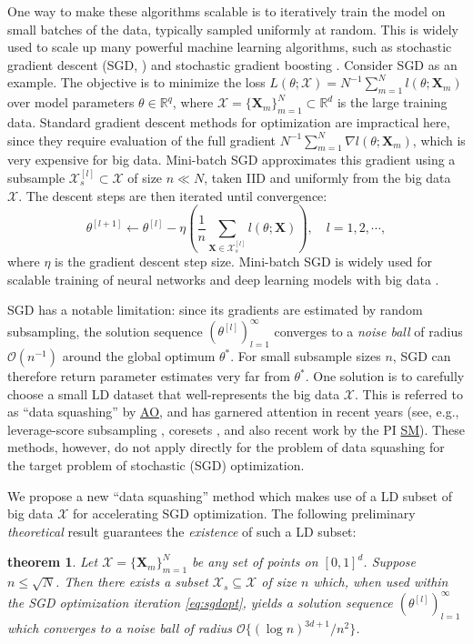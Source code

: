 \documentclass[11pt]{NSFamsart}
\newcommand{\SM}{\hyperlink{SMlink}{SM}\xspace}
\newcommand{\AO}{\hyperlink{AOlink}{AO}\xspace}
\newtheorem{theorem}{theorem}
\newcommand{\bX}{{\boldsymbol{X}}}
\begin{document}
One way to make these algorithms scalable is to iteratively train the model on small batches of the data, typically sampled uniformly at random. This is widely used to scale up many powerful machine learning algorithms, such as stochastic gradient descent (SGD, \cite{Bot2010}) and stochastic gradient boosting \cite{friedman2002stochastic}. Consider SGD as an example. The objective is to minimize the loss $L(\theta;\mathcal{X}) = N^{-1} \sum_{m=1}^N l(\theta;\bX_m)$ over model parameters $\theta \in \mathbb{R}^q$, where $\mathcal{X} = \{\bX_m\}_{m=1}^N \subset \mathbb{R}^d$ is the large training data. Standard gradient descent methods for optimization \cite{nocedal2006numerical} are impractical here, since they require evaluation of the full gradient $N^{-1} \sum_{m=1}^N \nabla l(\theta;\bX_m)$, which is very expensive for big data. Mini-batch SGD \cite{Bot2010} approximates this gradient using a subsample $\mathcal{X}_{s}^{[l]} \subset \mathcal{X}$ of size $n \ll N$, taken IID and uniformly from the big data $\mathcal{X}$. The descent steps are then iterated until convergence:
\begin{equation}\label{eq:sgdopt}
\theta^{[l+1]} \leftarrow \theta^{[l]} - \eta \left( \frac{1}{n} \sum_{\bX \in \mathcal{X}_{s}^{[l]}} l(\theta;\bX)\right) , \quad l = 1, 2, \cdots,
\end{equation}
where $\eta$ is the gradient descent step size. Mini-batch SGD is widely used for scalable training of neural networks and deep learning models with big data \citep{srivastava2014dropout}.

SGD has a notable limitation: since its gradients are estimated by random subsampling, the solution sequence $(\theta^{[l]})_{l=1}^\infty$ converges to a \textit{noise ball} of radius $\mathcal{O}(n^{-1})$ around the global optimum $\theta^*$. For small subsample sizes $n$, SGD can therefore return parameter estimates very far from  $\theta^*$. One solution is to carefully choose a small LD dataset that well-represents the big data $\mathcal{X}$. This is referred to as ``data squashing'' \cite{owen2003data} by \AO, and has garnered attention in recent years (see, e.g., leverage-score subsampling \cite{ma2015statistical}, coresets \cite{chan2006faster,bachem2017practical, huggins2016coresets}, and also recent work by the PI \SM \cite{mak2018support,mak2018minimax,mak2017projected,krishna2019distributional}). These methods, however, do not apply directly for the problem of data squashing for the target problem of stochastic (SGD) optimization.

We propose a new ``data squashing'' method which makes use of a LD subset of big data $\mathcal{X}$ for accelerating SGD optimization. The following preliminary \textit{theoretical} result guarantees the \textit{existence} of such a LD subset:
\begin{theorem}
Let $\mathcal{X} = \{\bX_m\}_{m=1}^N$ be any set of points on $[0,1]^d$. Suppose $n \leq \sqrt{N}$. Then there exists a subset $\mathcal{X}_s \subseteq \mathcal{X}$ of size $n$ which, when used within the SGD optimization iteration \eqref{eq:sgdopt}, yields a solution sequence $(\theta^{[l]})_{l=1}^\infty$ which converges to a noise ball of radius $\mathcal{O}\{(\log n)^{3d+1}/n^2\}$.
\end{theorem}
\end{document}
